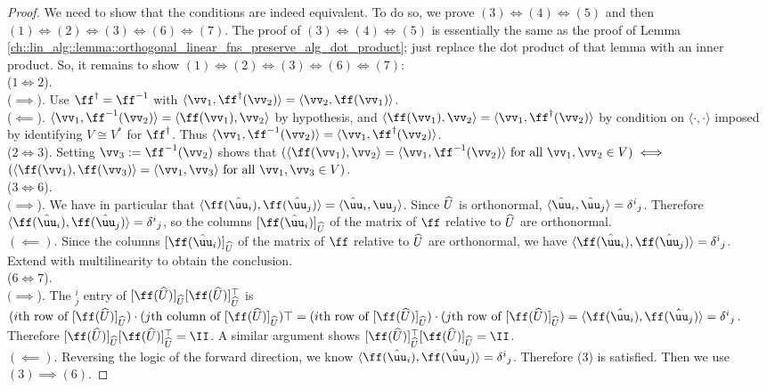 \begin{proof}
    We need to show that the conditions are indeed equivalent. To do so, we prove $(3) \iff (4) \iff (5)$ and then $(1) \iff (2) \iff (3) \iff (6) \iff (7)$. The proof of $(3) \iff (4) \iff (5)$ is essentially the same as the proof of Lemma \ref{ch::lin_alg::lemma::orthogonal_linear_fns_preserve_alg_dot_product}; just replace the dot product of that lemma with an inner product. So, it remains to show $(1) \iff (2) \iff (3) \iff (6) \iff (7)$:
    \mbox{} \\
        ($1 \iff 2$).
        \\ \indent ($\implies$). Use $\ff^\dag = \ff^{-1}$ with $\langle \vv_1, \ff^\dag(\vv_2) \rangle = \langle \vv_2, \ff(\vv_1) \rangle$.
        \\ \indent($\impliedby$). $\langle \vv_1, \ff^{-1}(\vv_2) \rangle = \langle \ff(\vv_1), \vv_2 \rangle$ by hypothesis, and $\langle \ff(\vv_1), \vv_2 \rangle = \langle \vv_1, \ff^\dag(\vv_2) \rangle$ by condition on $\langle \cdot, \cdot \rangle$ imposed by identifying $V \cong V^*$ for $\ff^\dag$. Thus $\langle \vv_1, \ff^{-1}(\vv_2) \rangle = \langle \vv_1, \ff^\dag(\vv_2) \rangle$.
        \\ ($2 \iff 3$). Setting $\vv_3 := \ff^{-1}(\vv_2)$ shows that ${(\langle \ff(\vv_1), \vv_2 \rangle = \langle \vv_1, \ff^{-1}(\vv_2) \rangle \text{ for all $\vv_1, \vv_2 \in V$})} \iff$ \\ ${(\langle \ff(\vv_1), \ff(\vv_3) \rangle = \langle \vv_1, \vv_3 \rangle \text{ for all $\vv_1, \vv_3 \in V$})}$.
        \\ ($3 \iff 6$). 
        \\ \indent $(\implies$). We have in particular that $\langle \ff(\huu_i), \ff(\huu_j) \rangle = \langle \huu_i, {\uu}_j \rangle$. Since $\widehat{U}$ is orthonormal, $\langle \huu_i, \huu_j \rangle = \delta^i{}_j$. Therefore $\langle \ff(\huu_i), \ff(\huu_j) \rangle = \delta^i{}_j$, so the columns $[\ff(\huu_i)]_{\hU}$ of the matrix of $\ff$ relative to $\widehat{U}$ are orthonormal.
        \\ \indent $(\impliedby)$. Since the columns $[\ff(\huu_i)]_{\hU}$ of the matrix of $\ff$ relative to $\widehat{U}$ are orthonormal, we have $\langle \ff(\huu_i), \ff(\huu_j) \rangle = \delta^i{}_j$. Extend with multilinearity to obtain the conclusion.
        \\ ($6 \iff 7$).
        \\ \indent $(\implies$). The $^i_j$ entry of $[\ff(\hU)]_{\hU} [\ff(\hU)]_{\hU}^\top$ is $(\text{$i$th row of $[\ff(\hU)]_{\hU}$}) \cdot (\text{$j$th column of $[\ff(\hU)]_{\hU}$})\top = (\text{$i$th row of $[\ff(\hU)]_{\hU}$}) \cdot (\text{$j$th row of $[\ff(\hU)]_{\hU}$}) = \langle \ff(\huu_i), \ff(\huu_j) \rangle = \delta^i{}_j$. Therefore $[\ff(\hU)]_{\hU} [\ff(\hU)]_{\hU}^\top = \II$. A similar argument shows $[\ff(\hU)]_{\hU}^\top [\ff(\hU)]_{\hU} = \II$.
        \\ \indent $(\impliedby)$. Reversing the logic of the forward direction, we know $\langle \ff(\huu_i), \ff(\huu_j) \rangle = \delta^i{}_j$. Therefore (3) is satisfied. Then we use $(3) \implies (6)$.
\end{proof}
